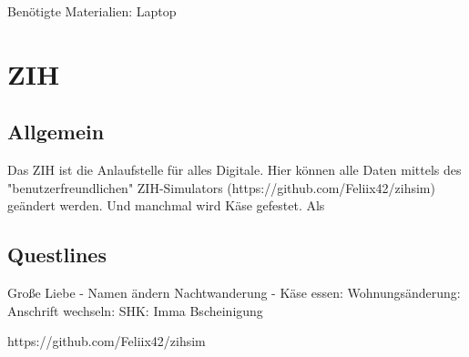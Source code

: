 Benötigte Materialien: Laptop
\section{ZIH}
\subsection{Allgemein}
Das ZIH ist die Anlaufstelle für alles Digitale. Hier können alle Daten mittels des "benutzerfreundlichen" ZIH-Simulators (https://github.com/Feliix42/zihsim) geändert werden. Und manchmal wird Käse gefestet.
Als 

\subsection{Questlines}
Große Liebe - Namen ändern
Nachtwanderung - Käse essen:
Wohnungsänderung: Anschrift wechseln:
SHK: Imma Bscheinigung

https://github.com/Feliix42/zihsim